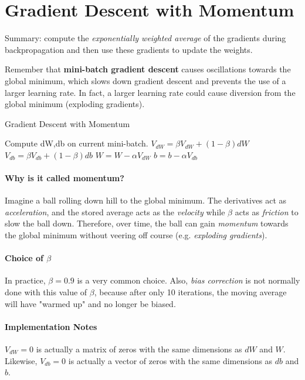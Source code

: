 \documentclass{article}
\begin{document}
\section{Gradient Descent with Momentum}

Summary: compute the \textit{exponentially weighted average} of the gradients during backpropagation and then use these gradients to update the weights.

Remember that \textbf{mini-batch gradient descent} causes oscillations towards the global minimum, which slows down gradient descent and prevents the use of a larger learning rate.  In fact, a larger learning rate could cause diversion from the global minimum (exploding gradients).

\begin{algorithm}[h]
\label{alg:grad_with_momentum}
\caption{Gradient Descent with Momentum}
Compute dW,db on current mini-batch. \;
$V_{dW} = \beta V_{dW} + (1-\beta) dW$ \;
$V_{db} = \beta V_{db} + (1-\beta) db$ \;
$W = W - \alpha V_{dW}$ \;
$b = b - \alpha V_{db}$ \;
\end{algorithm}

\paragraph{Why is it called momentum?}

Imagine a ball rolling down hill to the global minimum.  The derivatives act as \textit{acceleration}, and the stored average acts as the \textit{velocity} while $\beta$ acts as \textit{friction} to slow the ball down.  Therefore, over time, the ball can gain \textit{momentum} towards the global minimum without veering off course (e.g. \textit{exploding gradients}).

\paragraph{Choice of $\beta$}

In practice, $\beta = 0.9$ is a very common choice.  Also, \textit{bias correction} is not normally done with this value of $\beta$, because after only 10 iterations, the moving average will have "warmed up" and no longer be biased.

\paragraph{Implementation Notes}

$V_{dW} = 0$ is actually a matrix of zeros with the same dimensions as $dW$ and $W$.  Likewise, $V_{db} = 0$ is actually a vector of zeros with the same dimensions as $db$ and $b$.
\end{document}
